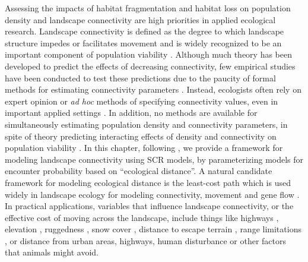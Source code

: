Assessing the impacts of habitat fragmentation and habitat loss on
population density and landscape connectivity are high priorities in
applied ecological research.  Landscape connectivity is defined as the
degree to which landscape structure impedes or facilitates movement
\citep{tischendorf_fahrig:2000} and is widely recognized to be an
important component of population viability
\citep{with_crist:1995}. Although much theory has been developed to
predict the effects of decreasing connectivity, few empirical studies
have been conducted to test these predictions due to the paucity of
formal methods for estimating connectivity parameters
\citep{cushman_etal:2010}. Instead, ecologists often rely on expert
opinion or \textit{ad hoc} methods of specifying connectivity values,
even in important applied settings
\citep{adriaensen_etal:2003,beier_etal:2008,zeller_etal:2012}. In
addition, no methods are available for simultaneously estimating
population density and connectivity parameters, in spite of theory
predicting interacting effects of density and connectivity on
population viability \citep{tischendorf_etal:2005,cushman_etal:2010}.
In this chapter, following \citet{royle_etal:2012ecol}, we provide a
framework for modeling landscape connectivity using SCR models, by
parameterizing models for encounter probability based on ``ecological
distance''.  A natural candidate framework for modeling ecological
distance is the least-cost path which is used widely in landscape
ecology for modeling connectivity, movement and gene flow
\citep{adriaensen_etal:2003,manel_etal:2003,mcrae_etal:2008}.  In
practical applications, variables that influence landscape
connectivity, or the effective cost of moving across the landscape,
include things like highways \citep[e.g.,][]{epps_etal:2005},
elevation \citep{cushman_etal:2006}, ruggedness
\citep{epps_etal:2007}, snow cover \citep{schwartz_etal:2009},
distance to escape terrain \citep{shirk_etal:2010}, range limitations
\citep{mcrae_beier:2007}, or distance from urban areas, highways,
human disturbance or other factors that animals might avoid. 



